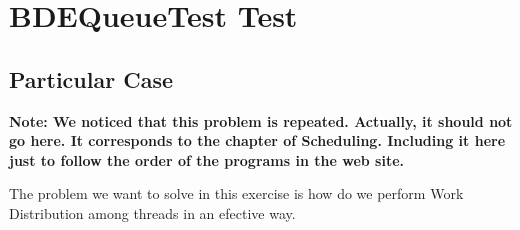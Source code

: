 \section{\textbf{BDEQueueTest Test}}
\subsection{Particular Case}
\par
\textbf{Note: We noticed that this problem is repeated. Actually, it should not
go here. It corresponds to the chapter of Scheduling. Including it here just to
follow the order of the programs in the web site.}
\par
The problem we want to solve in this exercise is how do we perform Work
Distribution among threads in an efective way.
\par

